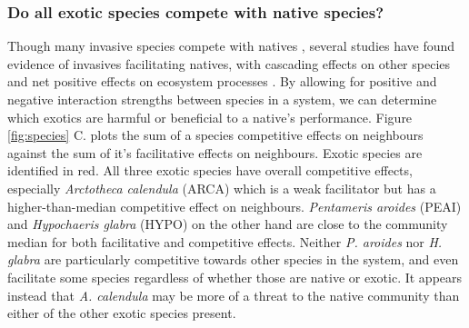 \documentclass[a4,12pt]{article}
\begin{document}
    \subsubsection*{Do all exotic species compete with native species?}
    Though many invasive species compete with natives \parencite{Naeem2000, Corbin2004, Riley2008, Zheng2015}, several studies have found evidence of invasives facilitating natives, with cascading effects on other species and net positive effects on ecosystem processes \parencite{Rodriguez2006, Ramus2017}. By allowing for positive and negative interaction strengths between species in a system, we can determine which exotics are harmful or beneficial to a native's performance. Figure \ref{fig:species} C. plots the sum of a species competitive effects on neighbours against the sum of it's facilitative effects on neighbours. Exotic species are identified in red. All three exotic species have overall competitive effects, especially \textit{Arctotheca calendula} (ARCA) which is a weak facilitator but has a higher-than-median competitive effect on neighbours. \textit{Pentameris aroides} (PEAI) and \textit{Hypochaeris glabra} (HYPO) on the other hand are close to the community median for both facilitative and competitive effects. Neither \textit{P. aroides} nor \textit{H. glabra} are particularly competitive towards other species in the system, and even facilitate some species regardless of whether those are native or exotic. It appears instead that \textit{A. calendula} may be more of a threat to the native community than either of the other exotic species present. 



\end{document}
